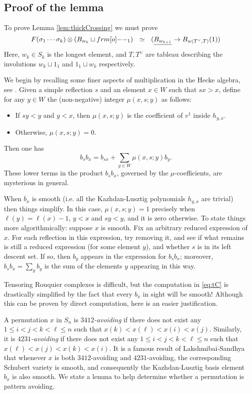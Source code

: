 \subsection{Proof of the lemma}
\label{subsec:boundinglemma}

To prove Lemma \ref{lem:thickCrossing} we must prove
\begin{equation} \label{eq:tC}
F(\sigma_1\cdots\sigma_k)\otimes(B_{w_k}\sqcup \one_1) \ \ \simeq \ \ (\underline{B_{w_{k+1}}}\rightarrow B_{w(T^\vee,T)}(1))
\end{equation}
Here, $w_k \in S_k$ is the longest element, and $T, T^\vee$ are tableau describing the involutions $w_k \sqcup 1_1$ and $1_1 \sqcup w_k$ respectively.

We begin by recalling some finer aspects of multiplication in the Hecke algebra, see \cite[Theorem 6.6]{LuszUnequal14}. Given a simple reflection $s$ and an element $x \in W$ such that $sx > x$, define for any $y \in W$ the (non-negative) integer $\mu(x,s;y)$ as follows: \begin{itemize} \item If $sy<y$ and $y < x$, then $\mu(x,s;y)$ is the coefficient of $v^1$ inside $h_{y,x}$. \item Otherwise, $\mu(x,s;y)=0$. \end{itemize} Then one has
\[ b_s b_x = b_{sx} + \sum_{y \in W} \mu(x,s;y) b_y. \]
These lower terms in the product $b_s b_x$, governed by the $\mu$-coefficients, are mysterious in general.

When $b_x$ is smooth (i.e. all the Kazhdan-Lusztig polynomials $h_{y,x}$ are trivial) then things simplify. In this case, $\mu(x,s;y) = 1$ precisely when $\ell(y) = \ell(x)-1$, $y<x$ and
$sy<y$, and it is zero otherwise. To state things more algorithmically: suppose $x$ is smooth. Fix an arbitrary reduced expression of $x$. For each reflection in this expression, try
removing it, and see if what remains is still a reduced expression (for some element $y$), and whether $s$ is in its left descent set. If so, then $b_y$ appears in the expression for
$b_s b_x$; moreover, $b_s b_x = \sum_y b_y$ is the sum of the elements $y$ appearing in this way.

Tensoring Rouquier complexes is difficult, but the computation in \eqref{eq:tC} is drastically simplified by the fact that every $b_x$ in sight will be smooth! Although this can be proven by direct computation, here is an easier justification.

A permutation $x$ in $S_n$ is \emph{$3412$-avoiding} if there does not exist any $1 \le i<j<k<\ell \le n$ such that $x(k) < x(\ell) < x(i) < x(j)$. Similarly, it is
\emph{$4231$-avoiding} if there does not exist any $1 \le i<j<k<\ell \le n$ such that $x(\ell) < x(j) < x(k) < x(i)$. It is a famous result of Lakshmibai-Sandhya \cite{LakSan90} that
whenever $x$ is both $3412$-avoiding and $4231$-avoiding, the corresponding Schubert variety is smooth, and consequently the Kazhdan-Lusztig basis element $b_x$ is also smooth. We state
a lemma to help determine whether a permutation is pattern avoiding.

